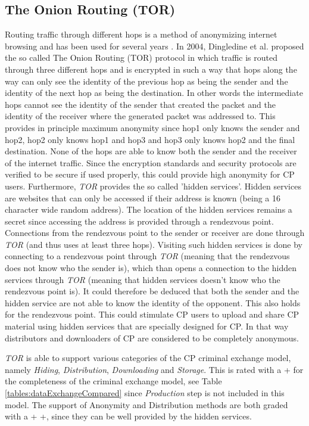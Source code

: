 \documentclass{sig-alternate-br}
\begin{document}
\subsection{The Onion Routing (TOR)}
Routing traffic through different hops is a method of anonymizing internet browsing and has been used for several years \cite{patil1963high}. In 2004, Dingledine et al. \cite{dingledine2004tor} proposed the so called The Onion Routing (TOR) protocol in which traffic is routed through three different hops and is encrypted in such a way that hops along the way can only see the identity of the previous hop as being the sender and the identity of the next hop as being the destination. In other words the intermediate hops cannot see the identity of the sender that created the packet and the identity of the receiver where the generated packet was addressed to. This provides in principle maximum anonymity since hop1 only knows the sender and hop2, hop2 only knows hop1 and hop3 and hop3 only knows hop2 and the final destination. None of the hops are able to know both the sender and the receiver of the internet traffic. Since the encryption standards and security protocols are verified \cite{goldberg2006security} to be secure if used properly, this could provide high anonymity for CP users. Furthermore, \textit{TOR} provides the so called 'hidden services'. Hidden services are websites that can only be accessed if their address is known (being a 16 character wide random address). The location of the hidden services remains a secret since accessing the address is provided through a rendezvous point. Connections from the rendezvous point to the sender or receiver are done through \textit{TOR} (and thus uses at least three hops). Visiting such hidden services is done by connecting to a rendezvous point through \textit{TOR} (meaning that the rendezvous does not know who the sender is), which than opens a connection to the hidden services through \textit{TOR} (meaning that hidden services doesn't know who the rendezvous point is). It could therefore be deduced that both the sender and the hidden service are not able to know the identity of the opponent. This also holds for the rendezvous point. This could stimulate CP users to upload and share CP material using hidden services that are specially designed for CP. In that way distributors and downloaders of CP are considered to be completely anonymous.

\textit{TOR} is able to support various categories of the CP criminal exchange model, namely \textit{Hiding}, \textit{Distribution}, \textit{Downloading} and \textit{Storage}. This is rated with a + for the completeness of the criminal exchange model, see Table \ref{tables:dataExchangeCompared} since \textit{Production} step is not included in this model. The support of Anonymity and Distribution methods are both graded with a + +, since they can be well provided by the hidden services.
\end{document}
